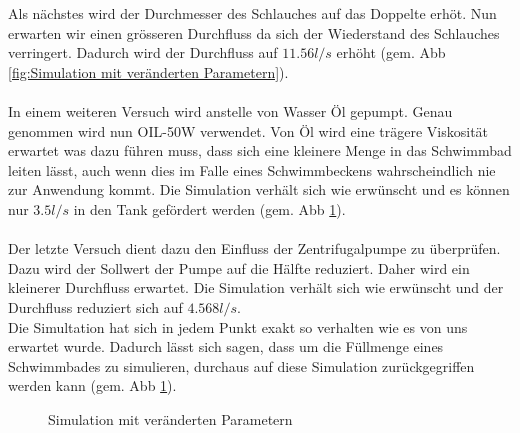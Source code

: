 Als nächstes wird der Durchmesser des Schlauches auf das Doppelte erhöt. Nun erwarten wir einen grösseren Durchfluss da sich der Wiederstand des Schlauches verringert. Dadurch wird der Durchfluss auf $11.56 l/s$ erhöht (gem. Abb \ref{fig:Simulation mit veränderten Parametern}).\\
\\
In einem weiteren Versuch wird anstelle von Wasser Öl gepumpt. Genau genommen wird nun OIL-50W verwendet. Von Öl wird eine trägere Viskosität erwartet was dazu führen muss, dass sich eine kleinere Menge in das Schwimmbad leiten lässt, auch wenn dies im Falle eines Schwimmbeckens wahrscheindlich nie zur Anwendung kommt. Die Simulation verhält sich wie erwünscht und es können nur $3.5 l/s$ in den Tank gefördert werden (gem. Abb \ref{fig:Simulation mit veränderten Parametern 2}).\\
\\
Der letzte Versuch dient dazu den Einfluss der Zentrifugalpumpe zu überprüfen. Dazu wird der Sollwert der Pumpe auf die Hälfte reduziert. Daher wird ein kleinerer Durchfluss erwartet. Die Simulation verhält sich wie erwünscht und der Durchfluss reduziert sich auf $4.568 l/s$.\\
Die Simultation hat sich in jedem Punkt exakt so verhalten wie es von uns erwartet wurde. Dadurch lässt sich sagen, dass um die Füllmenge eines Schwimmbades zu simulieren, durchaus auf diese Simulation zurückgegriffen werden kann (gem. Abb \ref{fig:Simulation mit veränderten Parametern 2}).

\begin{figure}[htb]
\caption{Simulation mit veränderten Parametern}
\label{fig:Simulation mit veränderten Parametern 2}
\end{figure}


